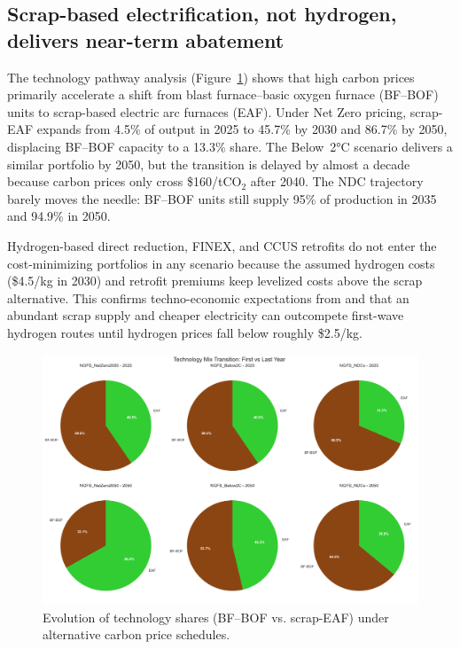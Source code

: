 \documentclass[preprint,1p,authoryear]{elsarticle}
\begin{document}
\subsection{Scrap-based electrification, not hydrogen, delivers near-term abatement}

The technology pathway analysis (Figure~\ref{fig:technology-transition}) shows that high carbon prices primarily accelerate a shift from blast furnace--basic oxygen furnace (BF--BOF) units to scrap-based electric arc furnaces (EAF). Under Net Zero pricing, scrap-EAF expands from 4.5\% of output in 2025 to 45.7\% by 2030 and 86.7\% by 2050, displacing BF--BOF capacity to a 13.3\% share. The Below~2°C scenario delivers a similar portfolio by 2050, but the transition is delayed by almost a decade because carbon prices only cross \$160/tCO$_2$ after 2040. The NDC trajectory barely moves the needle: BF--BOF units still supply 95\% of production in 2035 and 94.9\% in 2050.

Hydrogen-based direct reduction, FINEX, and CCUS retrofits do not enter the cost-minimizing portfolios in any scenario because the assumed hydrogen costs (\$4.5/kg in 2030) and retrofit premiums keep levelized costs above the scrap alternative. This confirms techno-economic expectations from \citet{MaterialEconomics2019} and \citet{demailly2018european} that an abundant scrap supply and cheaper electricity can outcompete first-wave hydrogen routes until hydrogen prices fall below roughly \$2.5/kg.

\begin{figure}[!t]
  \centering
  \includegraphics[width=0.8\linewidth]{technology_transition}
  \caption{Evolution of technology shares (BF--BOF vs. scrap-EAF) under alternative carbon price schedules.}
  \label{fig:technology-transition}
\end{figure}
\end{document}
